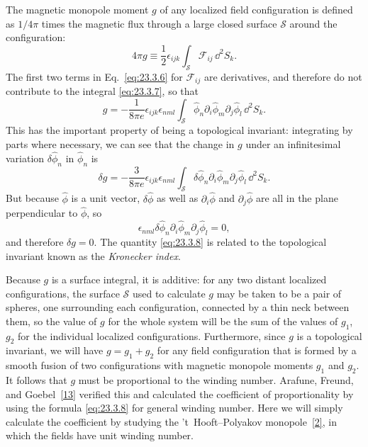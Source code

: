 The magnetic monopole moment $g$ of any localized field configuration is
defined as $1/4\pi$ times the magnetic flux through a large closed surface
$\mathcal S$ around the configuration:
\begin{equation}
 4\pi g\equiv\frac12\epsilon_{ijk}
 \int_{\mathcal S}\mathcal F_{ij}\,\dd^2S_k.
 \tag{23.3.7}\label{eq:23.3.7}
\end{equation}
The first two terms in Eq.~\eqref{eq:23.3.6} for $\mathcal F_{ij}$ are
derivatives, and therefore do not contribute to the integral
\eqref{eq:23.3.7}, so that
\begin{equation}
 g=-\frac1{8\pi e}\epsilon_{ijk}\epsilon_{nml}
 \int_{\mathcal S}\hat\phi_n\partial_i\hat\phi_m
 \partial_j\hat\phi_l\,\dd^2S_k.
 \tag{23.3.8}\label{eq:23.3.8}
\end{equation}
This has the important property of being a topological invariant:
integrating by parts where necessary, we can see that the change in $g$
under an infinitesimal variation $\delta\hat\phi_n$ in $\hat\phi_n$ is
\[
 \delta g=-\frac3{8\pi e}\epsilon_{ijk}\epsilon_{nml}
 \int_{\mathcal S}\delta\hat\phi_n\partial_i\hat\phi_m
 \partial_j\hat\phi_l\,\dd^2S_k.
\]
But because $\hat\phi$ is a unit vector, $\delta\hat\phi$ as well as
$\partial_i\hat\phi$ and $\partial_j\hat\phi$ are all in the plane
perpendicular to $\hat\phi$, so
\[
 \epsilon_{nml}\delta\hat\phi_n
 \partial_i\hat\phi_m\partial_j\hat\phi_l=0,
\]
and therefore $\delta g=0$. The quantity \eqref{eq:23.3.8} is related to
the topological invariant known as the \emph{Kronecker index}.

Because $g$ is a surface integral, it is additive: for any two distant
localized configurations, the surface $\mathcal S$ used to calculate $g$
may be taken to be a pair of spheres, one surrounding each configuration,
connected by a thin neck between them, so the value of $g$ for the whole
system will be the sum of the values of $g_1$, $g_2$ for the individual
localized configurations. Furthermore, since $g$ is a topological
invariant, we will have $g=g_1+g_2$ for any field configuration that is
formed by a smooth fusion of two configurations with magnetic monopole
moments $g_1$ and $g_2$. It follows that $g$ must be proportional to the
winding number. Arafune, Freund, and Goebel~\hyperref[ch23-ref-13]{[13]}
verified this and calculated the coefficient of proportionality by using
the formula \eqref{eq:23.3.8} for general winding number. Here we will
simply calculate the coefficient by studying the 't~Hooft--Polyakov
monopole~\hyperref[ch23-ref-2]{[2]}, in which the fields have unit winding
number.


